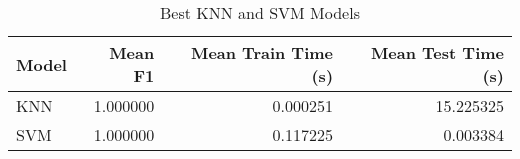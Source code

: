 \begin{table}
\centering
\caption{Best KNN and SVM Models}
\label{tab:best_knn_and_svm_summary_mushroom}
\begin{tabular}{lrrr}
\toprule
Model & Mean F1 & Mean Train Time (s) & Mean Test Time (s) \\
\midrule
KNN & 1.000000 & 0.000251 & 15.225325 \\
SVM & 1.000000 & 0.117225 & 0.003384 \\
\bottomrule
\end{tabular}
\end{table}
